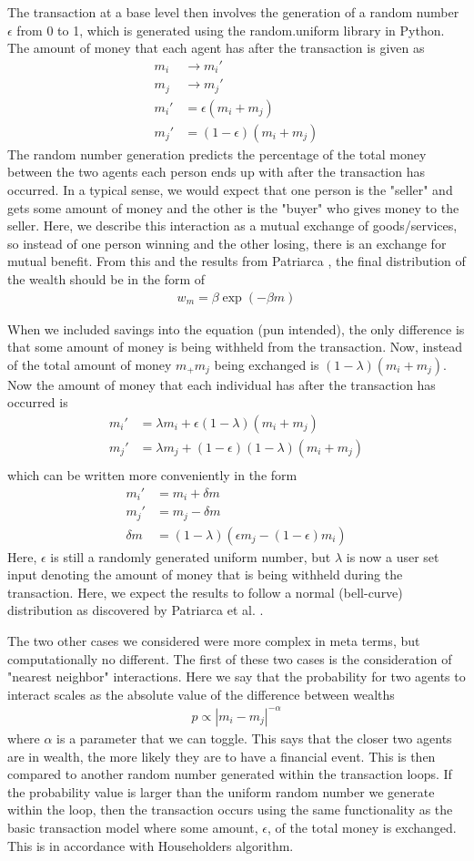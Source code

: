 \documentclass[11pt]{article}
\newcommand{\ba}{\[\begin{aligned}}
\newcommand{\ea}{\end{aligned}\]}
\begin{document}
	The transaction at a base level then involves the generation of a random number $\epsilon$ from 0 to 1, which is generated using the random.uniform library in Python. The amount of money that each agent has after the transaction is given as
	\ba
	m_i &\rightarrow m_i'\\
	m_j &\rightarrow m_j'\\
	m_i' &= \epsilon (m_i+m_j)\\
	m_j' &= (1-\epsilon)(m_i+m_j)
	\ea
	The random number generation predicts the percentage of the total money between the two agents each person ends up with after the transaction has occurred. In a typical sense, we would expect that one person is the "seller" and gets some amount of money and the other is the "buyer" who gives money to the seller. Here, we describe this interaction as a mutual exchange of goods/services, so instead of one person winning and the other losing, there is an exchange for mutual benefit. From this and the results from Patriarca \cite{patriarca}, the final distribution of the wealth should be in the form of 
	\ba
	w_m=\beta \exp{(-\beta m)}
	\ea
	
	When we included savings into the equation (pun intended), the only difference is that some amount of money is being withheld from the transaction. Now, instead of the total amount of money $m_+m_j$ being exchanged is $(1-\lambda)(m_i+m_j)$. Now the amount of money that each individual has after the transaction has occurred is
	\ba
	m_i' &= \lambda m_i+\epsilon(1-\lambda)(m_i+m_j)\\
	m_j' &= \lambda m_j+(1-\epsilon)(1-\lambda)(m_i+m_j)\\
	\ea
	which can be written more conveniently in the form
	\ba
	m_i'&=m_i+\delta m\\
	m_j'&=m_j-\delta m\\
	\delta m &=(1-\lambda)(\epsilon m_j-(1-\epsilon)m_i)
	\ea
	Here, $\epsilon$ is still a randomly generated uniform number, but $\lambda$ is now a user set input denoting the amount of money that is being withheld during the transaction. Here, we expect the results to follow a normal (bell-curve) distribution as discovered by Patriarca et al. \cite{patriarca}. 
	
	The two other cases we considered were more complex in meta terms, but computationally no different. The first of these two cases is the consideration of "nearest neighbor" interactions. Here we say that the probability for two agents to interact scales as the absolute value of the difference between wealths
	\ba
	p \propto |m_i-m_j|^{-\alpha}
	\ea
	where $\alpha$ is a parameter that we can toggle. This says that the closer two agents are in wealth, the more likely they are to have a financial event. This is then compared to another random number generated within the transaction loops. If the probability value is larger than the uniform random number we generate within the loop, then the transaction occurs using the same functionality as the basic transaction model where some amount, $\epsilon$, of the total money is exchanged. This is in accordance with Householders algorithm. 
	
\end{document}
